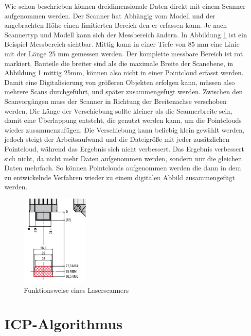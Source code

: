 Wie schon beschrieben können dreidimensionale Daten direkt mit einem 
Scanner aufgenommen werden. 
Der Scanner hat Abhängig vom Modell und der angebrachten Höhe einen limitierten
Bereich den er erfassen kann. 
Je nach Scannertyp und Modell kann sich der Messbereich ändern.
In Abbildung \ref{fig:scanner} ist ein Beispiel Messbereich sichtbar. Mittig kann 
in einer Tiefe von 85 mm eine Linie mit der Länge 25 mm gemessen werden. 
Der komplette messbare Bereich ist rot markiert. \cite{MESSTECHNIK_2020}
Bauteile die breiter sind als die maximale Breite der Scanebene, in Abbildung \ref{fig:scanner} mittig 25mm, 
können also nicht in einer Pointcloud erfasst werden. 
Damit eine Digitalisierung von größeren Objekten erfolgen kann, müssen
also mehrere Scans durchgeführt, und später zusammengefügt werden. Zwischen den 
Scanvorgängen muss der Scanner in Richtung der Breitenachse verschoben werden.
Die Länge der Verschiebung sollte kleiner als die Scannerbreite sein, 
damit eine Überlappung entsteht, die 
genutzt werden kann, um die Pointclouds wieder zusammenzufügen. Die Verschiebung kann 
beliebig klein gewählt werden, jedoch steigt der Arbeitsaufwand und die Dateigröße mit 
jeder zusätzlichen Pointcloud, während das Ergebnis sich nicht verbessert.
Das Ergebnis verbessert sich nicht, da nicht mehr Daten aufgenommen werden, sondern nur 
die gleichen Daten mehrfach.
So können Pointclouds aufgenommen werden die dann in dem zu entwickelnde Verfahren
wieder zu einem digitalen Abbild zusammengefügt werden.

\begin{figure}[h]
    \centering
    \includegraphics[width=0.3\textwidth]{images/Scanner.PNG}
    \caption{Funktionsweise eines Laserscanners}
    \label{fig:scanner}
\end{figure}

\section{ICP-Algorithmus}


